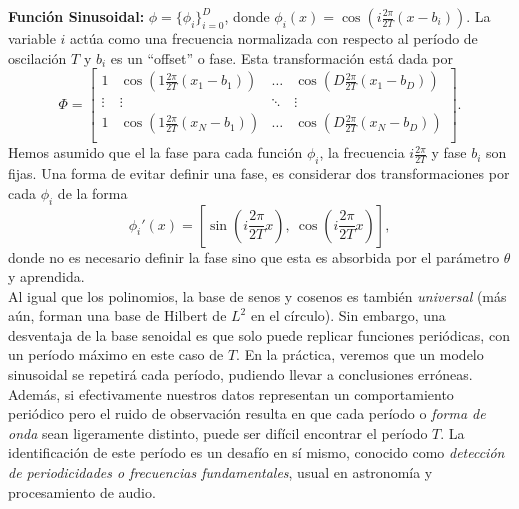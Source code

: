 \noindent\textbf{Función Sinusoidal:} $\phi=\{\phi_i\}_{i=0}^D$, donde $\phi_i(x)=\cos\left(i\frac{2\pi}{2T}(x - b_i)\right)$. La variable $i$ actúa como una frecuencia normalizada con respecto al período de oscilación $T$ y $b_i$ es un ``offset''  o fase. Esta transformación está dada por
\begin{equation}
    \Phi = \left[ \begin{matrix}
    1 & \cos\left(1\frac{2\pi}{2T}(x_1-b_1)\right) & \ldots & \cos\left(D\frac{2\pi}{2T}(x_1-b_D)\right)\\
    \vdots & \vdots  & \ddots & \vdots \\
    1 & \cos\left(1\frac{2\pi}{2T}(x_N-b_1)\right) & \ldots & \cos\left(D\frac{2\pi}{2T}(x_N-b_D)\right)\\
    \end{matrix} \right].
\end{equation}
Hemos asumido que el la fase para cada función $\phi_i$, la frecuencia $i\frac{2\pi}{2T}$ y fase $b_i$ son fijas. Una forma de evitar definir una fase, es considerar dos transformaciones por cada $\phi_i$ de la forma
\begin{equation}
    \phi_i'(x) = \left[\sin\left(i\frac{2\pi}{2T}x\right),\ \cos\left(i\frac{2\pi}{2T}x\right)\right],
\end{equation}
donde no es necesario definir la fase sino que esta es absorbida por el parámetro $\theta$ y aprendida.\\

Al igual que los polinomios, la base de senos y cosenos es también \emph{universal} (más aún, forman una base de Hilbert de $L^2$ en el círculo). Sin embargo, una desventaja de la base senoidal es que solo puede replicar funciones periódicas, con un período máximo en este caso  de $T$. En la práctica, veremos que un modelo sinusoidal se repetirá cada período, pudiendo llevar a conclusiones erróneas. Además, si efectivamente nuestros datos representan un comportamiento periódico pero el ruido de observación resulta en que cada período o \emph{forma de onda} sean ligeramente distinto, puede ser difícil encontrar el período $T$. La identificación de este período es un desafío en sí mismo, conocido como \emph{detección de periodicidades o frecuencias fundamentales}, usual en astronomía y procesamiento de audio. \\

